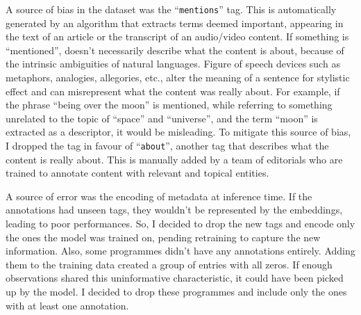 A source of bias in the dataset was the ``\verb|mentions|'' tag. This is automatically generated by an algorithm that extracts
terms deemed important, appearing in the text of an article or the transcript of an audio/video content.
If something is ``mentioned'', doesn't necessarily describe what the content is about, because of the intrinsic ambiguities of natural languages.
Figure of speech devices such as metaphors, analogies, allegories, etc., alter the meaning of a sentence for stylistic effect and can
misrepresent what the content was really about. For example, if the phrase ``being over the moon'' is mentioned,
while referring to something unrelated to the topic of ``space'' and ``universe'',
and the term ``moon'' is extracted as a descriptor, it would be misleading.
To mitigate this source of bias, I dropped the tag in favour of ``\verb|about|'', another tag that describes what the content is really about.
This is manually added by a team of editorials who are trained to annotate content with relevant and topical entities.

A source of error was the encoding of metadata at inference time. If the annotations had unseen tags, they wouldn't be represented
by the embeddings, leading to poor performances. So, I decided to drop the new tags and encode only the ones the model was trained on, pending retraining to capture the new information.
Also, some programmes didn't have any annotations entirely. Adding them to the training data created a group of entries with all zeros.
If enough observations shared this uninformative characteristic, it could have been picked up by the model.
I decided to drop these programmes and include only the ones with at least one annotation.
